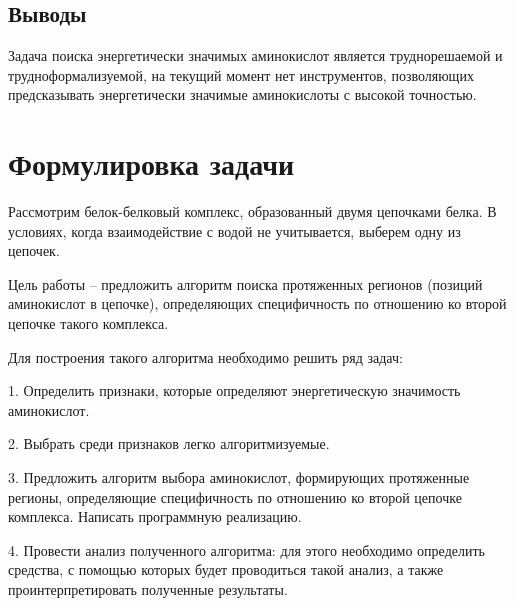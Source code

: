 \subsection{Выводы}
Задача поиска энергетически значимых аминокислот является труднорешаемой и трудноформализуемой, на текущий момент нет  инструментов, позволяющих предсказывать энергетически значимые аминокислоты с высокой точностью. 

\section{Формулировка задачи}
Рассмотрим белок-белковый комплекс, образованный двумя цепочками белка. В условиях, когда взаимодействие с водой не учитывается, выберем одну из цепочек. 

Цель работы -- предложить алгоритм поиска протяженных регионов (позиций аминокислот в цепочке), определяющих специфичность по отношению ко второй цепочке такого комплекса.

Для построения такого алгоритма необходимо решить ряд задач:

1. Определить признаки, которые определяют энергетическую значимость аминокислот.

2. Выбрать среди признаков легко алгоритмизуемые.

3. Предложить алгоритм выбора аминокислот, формирующих протяженные регионы, определяющие специфичность по отношению ко второй цепочке комплекса. Написать программную реализацию.

4. Провести анализ полученного алгоритма: для этого необходимо определить средства, с помощью которых будет проводиться такой анализ, а также проинтерпретировать полученные результаты.

